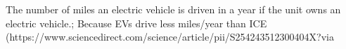 The number of miles an electric vehicle is driven in a year if the unit owns an electric vehicle.; Because EVs drive less miles/year than ICE (https://www.sciencedirect.com/science/article/pii/S254243512300404X?via%
